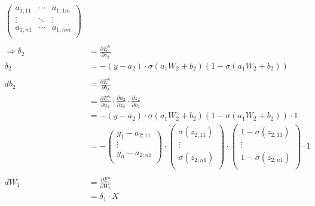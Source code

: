 \begin{align*}
\begin{pmatrix}
                                                                        a_{1;11} & \cdots & a_{1;1m} \\
                                                                        \vdots & \ddots & \vdots \\
                                                                        a_{1;n1}&\cdots & a_{1;nm}  \\
                                                                        \end{pmatrix} \\\\
    \Rightarrow \delta_{2} &= \frac{\partial E^{n}}{\partial z_{2}}\\
     \delta_{2} &= -(y-a_{2}) \cdot \sigma(a_{1}W_{2}+b_{2})(1-\sigma(a_{1}W_{2}+b_{2}))\\\\
    db_{2} &= \frac{\partial E^{n}}{\partial b_{2}}\\
    &= \frac{\partial E^{n}}{\partial a_{2}} \cdot \frac{\partial a_{2}}{\partial z_{2}} \cdot \frac{\partial z_{2}}{\partial b_{2}}\\
    &= -(y-a_{2}) \cdot \sigma(a_{1}W_{2}+b_{2})(1-\sigma(a_{1}W_{2}+b_{2})) \cdot 1\\
    &=-\begin{pmatrix}
        y_{1}  -  a_{2;11} \\
        \vdots \\
        y_{n}  -  a_{2;n1}  \\
        \end{pmatrix} \cdot \begin{pmatrix}
                            \sigma (z_{2;11}) \\
                            \vdots \\
                            \sigma (z_{2;n1})  \\
                            \end{pmatrix} \cdot \begin{pmatrix}
                                                    1-\sigma (z_{2;11}) \\
                                                    \vdots \\
                                                    1-\sigma (z_{2;n1})  \\
                                                    \end{pmatrix} \cdot 1 \\\\
    dW_{1} &= \frac{\partial E^{n}}{\partial W_{1}}\\
    &= \delta_{1} \cdot X\\\\
\end{align*}
